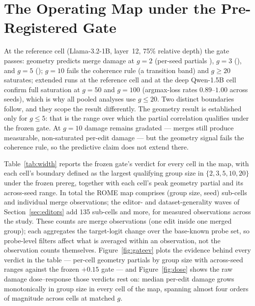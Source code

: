 \documentclass[preprint,12pt]{elsarticle}
\theoremstyle{definition}
\begin{document}
\section{The Operating Map under the Pre-Registered Gate}\label{sec:map}
At the reference cell (Llama-3.2-1B, layer~12, 75\% relative depth) the gate passes:
geometry predicts merge damage at $g{=}2$ (per-seed partials ), $g{=}3$
(), and $g{=}5$ (); $g{=}10$ fails the coherence
rule (a transition band) and $g\geq20$ saturates; extended runs at the reference cell and
at the deep Qwen-1.5B cell confirm full saturation at $g{=}50$ and $g{=}100$ (argmax-loss
rates $0.89$--$1.00$ across seeds), which is why all pooled analyses use $g\leq20$. Two
distinct boundaries follow, and they scope the result differently. The geometry result is
established only for $g\leq5$: that is the range over which the partial correlation
qualifies under the frozen gate. At $g{=}10$ damage remains gradated --- merges still
produce measurable, non-saturated per-edit damage --- but the geometry signal fails the
coherence rule, so the predictive claim does not extend there.

Table~\ref{tab:width} reports the frozen gate's verdict for every cell in the map, with
each cell's boundary defined as the largest qualifying group size in $\{2,3,5,10,20\}$
under the frozen prereg, together with each cell's peak geometry partial and its
across-seed range. In total the ROME map comprises \nSubcells{} (group size, seed)
sub-cells and \nObsRome{} individual merge observations; the editor- and
dataset-generality waves of Section~\ref{sec:editors} add 135 sub-cells and
\nObsEditors{} more, for \nObsTotal{} measured observations across the study. These
counts are merge observations (one edit inside one merged group); each aggregates the
target-logit change over the base-known probe set, so probe-level filters affect what
is averaged within an observation, not the observation counts themselves.
Figure~\ref{fig:gateev} plots the evidence behind every verdict in the table ---
per-cell geometry partials by group size with across-seed ranges against the frozen
$+0.15$ gate --- and Figure~\ref{fig:dose} shows the raw damage dose--response those
verdicts rest on: median per-edit damage grows monotonically in group size in every
cell of the map, spanning almost four orders of magnitude across cells at matched $g$.
\end{document}
